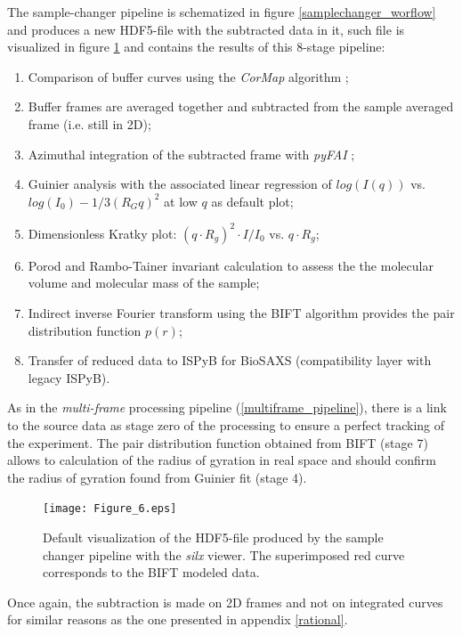 \documentclass[preprint]{iucr}              %
\begin{document}
The sample-changer pipeline is schematized in figure \ref{samplechanger_worflow} and produces a new HDF5-file with the subtracted data in it, such file is visualized in figure \ref{subtracted} and contains the results of this 8-stage pipeline: 
\begin{enumerate}
    \item Comparison of buffer curves using the \textit{CorMap} algorithm \cite{CorMap};
    \item Buffer frames are averaged together and subtracted from the sample averaged frame (i.e. still in 2D);
    \item Azimuthal integration of the subtracted frame with \textit{pyFAI} \cite{pyfai_2020};
    \item Guinier analysis with the associated linear regression of $log(I(q))$ vs. $log(I_0)-1/3 (R_{G}q)^{2}$ at low $q$ as default plot;
    \item Dimensionless Kratky plot: $(q\cdot R_g)^2\cdot I/I_0$  vs. $q\cdot R_g$;
    \item Porod \cite{glatter+kratky} and Rambo-Tainer invariant \cite{RamboTainerNature2013} calculation to assess the the molecular volume and molecular mass of the sample;
    \item Indirect inverse Fourier transform using the BIFT algorithm \cite{bift} provides the pair distribution function $p(r)$;
    \item Transfer of reduced data to ISPyB for BioSAXS (compatibility layer with legacy ISPyB).
\end{enumerate}
As in the \textit{multi-frame} processing pipeline (\ref{multiframe_pipeline}), there is a link to the source data as stage zero of the processing to ensure a perfect tracking of the experiment.
The pair distribution function obtained from BIFT (stage 7) allows to calculation of the radius of gyration in real space and should confirm the radius of gyration found from Guinier fit (stage 4). 

\begin{figure}
\label{subtracted}
\texttt{[image: Figure\_6.eps]}
\caption{Default visualization of the HDF5-file produced by the sample changer pipeline with the \textit{silx} viewer. 
The superimposed red curve corresponds to the BIFT modeled data.}
\end{figure}



Once again, the subtraction is made on 2D frames and not on integrated curves for similar reasons as the one presented in appendix \ref{rational}.
\end{document}
